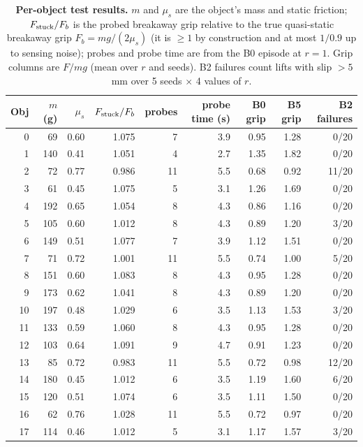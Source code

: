 \begin{table}[!htbp]\centering\footnotesize
\caption{\textbf{Per-object test results.} $m$ and $\mu_s$ are the object's mass and static friction; $F_{\rm stuck}/F_b$ is the probed
breakaway grip relative to the true quasi-static breakaway grip $F_b=mg/(2\mu_s)$ (it is $\ge1$ by construction and at most
$1/0.9$ up to sensing noise); probes and probe time are from the B0 episode at $r=1$. Grip columns are $F/mg$ (mean over $r$ and seeds).
B2 failures count lifts with slip $>5$\,mm over 5 seeds $\times$ 4 values of $r$.}\label{tab:perobj}
\setlength{\tabcolsep}{5pt}
\begin{tabular}{@{}rrrrrrrrr@{}}\toprule
Obj & $m$ (g) & $\mu_s$ & $F_{\rm stuck}/F_b$ & probes & probe time (s) & B0 grip & B5 grip & B2 failures\\\midrule
0 & 69 & 0.60 & 1.075 & 7 & 3.9 & 0.95 & 1.28 & 0/20 \\
1 & 140 & 0.41 & 1.051 & 4 & 2.7 & 1.35 & 1.82 & 0/20 \\
2 & 72 & 0.77 & 0.986 & 11 & 5.5 & 0.68 & 0.92 & 11/20 \\
3 & 61 & 0.45 & 1.075 & 5 & 3.1 & 1.26 & 1.69 & 0/20 \\
4 & 192 & 0.65 & 1.054 & 8 & 4.3 & 0.86 & 1.16 & 0/20 \\
5 & 105 & 0.60 & 1.012 & 8 & 4.3 & 0.89 & 1.20 & 3/20 \\
6 & 149 & 0.51 & 1.077 & 7 & 3.9 & 1.12 & 1.51 & 0/20 \\
7 & 71 & 0.72 & 1.001 & 11 & 5.5 & 0.74 & 1.00 & 5/20 \\
8 & 151 & 0.60 & 1.083 & 8 & 4.3 & 0.95 & 1.28 & 0/20 \\
9 & 173 & 0.62 & 1.041 & 8 & 4.3 & 0.89 & 1.20 & 0/20 \\
10 & 197 & 0.48 & 1.029 & 6 & 3.5 & 1.13 & 1.53 & 3/20 \\
11 & 133 & 0.59 & 1.060 & 8 & 4.3 & 0.95 & 1.28 & 0/20 \\
12 & 103 & 0.64 & 1.091 & 9 & 4.7 & 0.91 & 1.23 & 0/20 \\
13 & 85 & 0.72 & 0.983 & 11 & 5.5 & 0.72 & 0.98 & 12/20 \\
14 & 180 & 0.45 & 1.012 & 6 & 3.5 & 1.19 & 1.60 & 6/20 \\
15 & 120 & 0.51 & 1.074 & 6 & 3.5 & 1.11 & 1.50 & 0/20 \\
16 & 62 & 0.76 & 1.028 & 11 & 5.5 & 0.72 & 0.97 & 0/20 \\
17 & 114 & 0.46 & 1.012 & 5 & 3.1 & 1.17 & 1.57 & 3/20 \\

\end{tabular}
\end{table}
